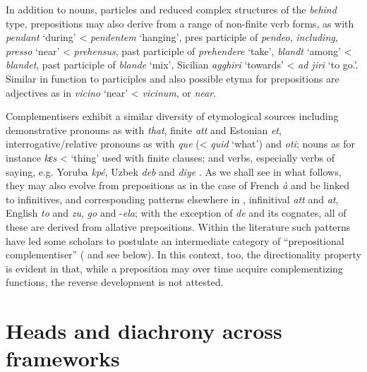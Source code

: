 \documentclass[output=paper]{langsci/langscibook}
\begin{document}
In addition to nouns, particles and reduced complex structures of the
\emph{behind} type, prepositions may also derive from a range of non-finite
verb forms, as with  \emph{pendant} `during' < 
\emph{pendentem} `hanging', pres participle of \emph{pendeo}, 
\emph{including},  \emph{presso} `near' < 
\emph{prehensus}, past participle of \emph{prehendere} `take', 
\emph{blandt} `among' < \emph{blandet}, past participle of \emph{blande}
`mix', Sicilian \emph{agghiri} `towards' < \emph{ad jiri} `to go.\Inf{}'.
Similar in function to participles and also possible etyma for prepositions are
adjectives as in  \emph{vicino} `near' < 
\emph{vicinum}, or  \emph{near}.

Complementisers exhibit a similar diversity of etymological sources including
demonstrative pronouns as with  \emph{that},  finite
\emph{att} and Estonian \emph{et}, interrogative/relative pronouns  as with
 \emph{que} (<  \emph{quid} `what') and 
\emph{oti}; nouns as for instance  \emph{kεs} <
`thing' used with finite clauses; and verbs, especially verbs of saying, e.g.
Yoruba \emph{kp\'e}, Uzbek \emph{deb} and  \emph{diye}
\citep[870--874]{KehaBoye16}. As we shall see in what follows, they may also
evolve from prepositions as in the case of French \emph{\`a} and be linked to
infinitives, and corresponding patterns elsewhere in ,
 infinitival \emph{att} and  \emph{at}, English
\emph{to} and  \emph{zu},  \emph{go} and 
-\emph{ela}; with the exception of \emph{de}  and its cognates, all of these
are derived from allative prepositions. Within the literature such patterns
have led some scholars to postulate an intermediate category of
\enquote{prepositional complementiser} (\citealt{Borsley86,Borsley01,Kayne99}
and see  below). In this context, too, the directionality
property is evident in that, while a preposition may over time acquire
complementizing functions, the reverse development is not attested.

\section{Heads and diachrony across frameworks}
\end{document}
